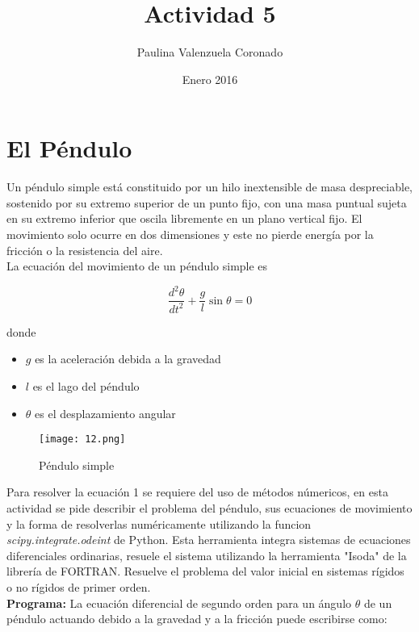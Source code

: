 \documentclass[12pt]{article}
\title{Actividad 5}
\author{Paulina Valenzuela Coronado}
\date{Enero 2016}
\begin{document}
\maketitle

\section{El Péndulo}

Un péndulo simple está constituido por un hilo inextensible de masa despreciable, sostenido por su extremo superior de un punto fijo, con una masa puntual sujeta en su extremo inferior que oscila libremente en un plano vertical fijo.
El movimiento solo ocurre en dos dimensiones y este no pierde energía por la fricción o la resistencia del aire.\cite{Wiki} \\

La ecuación del movimiento de un péndulo simple es 

\begin{equation}
\frac{
d^2\theta}{dt^2}+\frac{g}{l}\sin\theta=0
\end{equation}

donde
\begin{itemize}
\item $g$ es la aceleración debida a la gravedad
\item $l$ es el lago del péndulo
\item $\theta$ es el desplazamiento angular 
\end{itemize}

\begin{figure}[H]
	\centering
\texttt{[image: 12.png]}
 \caption{Péndulo simple}
\end{figure} 

Para resolver la ecuación 1 se requiere del uso de métodos númericos, en esta actividad se pide describir el problema del péndulo, sus ecuaciones de movimiento y la forma de resolverlas numéricamente utilizando la funcion \textit{scipy.integrate.odeint} de Python.
Esta herramienta integra sistemas de ecuaciones diferenciales ordinarias, resuele el sistema utilizando la herramienta "Isoda" de la librería de FORTRAN.
Resuelve el problema del valor inicial en sistemas rígidos o no rígidos de primer orden. \\

\textbf{Programa:}
La ecuación diferencial de segundo orden 
para un ángulo $\theta$ de un péndulo actuando debido a la gravedad y a la fricción puede escribirse como:
\end{document}
